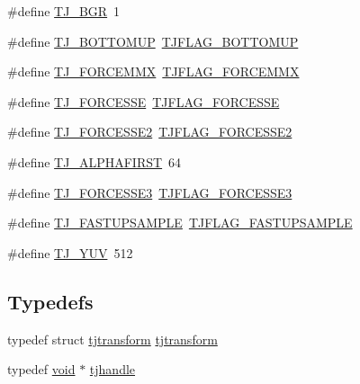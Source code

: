 \begin{DoxyCompactItemize}
\item 
\#define \hyperlink{group___turbo_j_p_e_g_ga3a790b5156c6d435e819d370dbdb44f4}{T\+J\+\_\+\+B\+GR}~1
\item 
\#define \hyperlink{group___turbo_j_p_e_g_ga109343795e7845e921a490a834809d64}{T\+J\+\_\+\+B\+O\+T\+T\+O\+M\+UP}~\hyperlink{group___turbo_j_p_e_g_ga72ecf4ebe6eb702d3c6f5ca27455e1ec}{T\+J\+F\+L\+A\+G\+\_\+\+B\+O\+T\+T\+O\+M\+UP}
\item 
\#define \hyperlink{group___turbo_j_p_e_g_ga5592507320e240386d9ae06bf34a522a}{T\+J\+\_\+\+F\+O\+R\+C\+E\+M\+MX}~\hyperlink{group___turbo_j_p_e_g_ga4e872f11c82f241736fa8297920f24e5}{T\+J\+F\+L\+A\+G\+\_\+\+F\+O\+R\+C\+E\+M\+MX}
\item 
\#define \hyperlink{group___turbo_j_p_e_g_ga7a71fec0a95f179db6ba478aa3f4258b}{T\+J\+\_\+\+F\+O\+R\+C\+E\+S\+SE}~\hyperlink{group___turbo_j_p_e_g_gae17e63189e8cd730feed3efbd2454f38}{T\+J\+F\+L\+A\+G\+\_\+\+F\+O\+R\+C\+E\+S\+SE}
\item 
\#define \hyperlink{group___turbo_j_p_e_g_gaa1f9581ec7c9bbaaa927b058843b859c}{T\+J\+\_\+\+F\+O\+R\+C\+E\+S\+S\+E2}~\hyperlink{group___turbo_j_p_e_g_ga8cf0bca96ea4d472563f4b0ebf8c48e7}{T\+J\+F\+L\+A\+G\+\_\+\+F\+O\+R\+C\+E\+S\+S\+E2}
\item 
\#define \hyperlink{group___turbo_j_p_e_g_ga944d444ec45acfbe0e57b620863f6903}{T\+J\+\_\+\+A\+L\+P\+H\+A\+F\+I\+R\+ST}~64
\item 
\#define \hyperlink{group___turbo_j_p_e_g_gad26795eaa44f3829b84ac738c0e3254d}{T\+J\+\_\+\+F\+O\+R\+C\+E\+S\+S\+E3}~\hyperlink{group___turbo_j_p_e_g_gaf9d49066633404da4386d70820295dd2}{T\+J\+F\+L\+A\+G\+\_\+\+F\+O\+R\+C\+E\+S\+S\+E3}
\item 
\#define \hyperlink{group___turbo_j_p_e_g_gaac2d4b966a497ad5db3cc8ba88e739b5}{T\+J\+\_\+\+F\+A\+S\+T\+U\+P\+S\+A\+M\+P\+LE}~\hyperlink{group___turbo_j_p_e_g_ga4ee4506c81177a06f77e2504a22efd2d}{T\+J\+F\+L\+A\+G\+\_\+\+F\+A\+S\+T\+U\+P\+S\+A\+M\+P\+LE}
\item 
\#define \hyperlink{group___turbo_j_p_e_g_ga8bffe3d10fcd60251343e20291aff9d8}{T\+J\+\_\+\+Y\+UV}~512
\end{DoxyCompactItemize}
\subsection*{Typedefs}
\begin{DoxyCompactItemize}
\item 
typedef struct \hyperlink{structtjtransform}{tjtransform} \hyperlink{group___turbo_j_p_e_g_gaa29f3189c41be12ec5dee7caec318a31}{tjtransform}
\item 
typedef \hyperlink{png_8h_ac9c84fa68bbad002983e35ce3663c686}{void} $\ast$ \hyperlink{group___turbo_j_p_e_g_ga758d2634ecb4949de7815cba621f5763}{tjhandle}
\end{DoxyCompactItemize}

